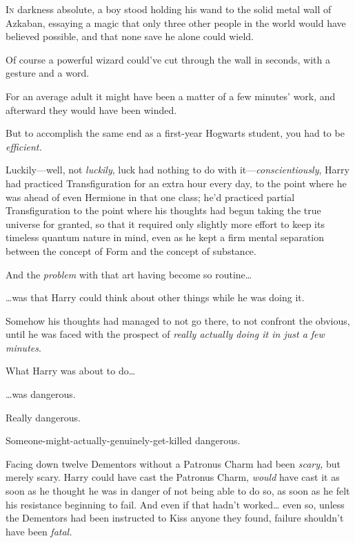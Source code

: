 
\lettrine{I}{n} darkness absolute, a boy stood holding his wand to the solid metal wall of 
Azkaban, essaying a magic that only three other people in the world would have 
believed possible, and that none save he alone could wield.

Of course a powerful wizard could've cut through the wall in seconds, with a 
gesture and a word.

For an average adult it might have been a matter of a few minutes' work, and 
afterward they would have been winded.

But to accomplish the same end as a first-year Hogwarts student, you had to be 
\emph{efficient.}

Luckily---well, not \emph{luckily}, luck had nothing to do with 
it---\emph{conscientiously}, Harry had practiced Transfiguration for an extra 
hour every day, to the point where he was ahead of even Hermione in that one 
class; he'd practiced partial Transfiguration to the point where his thoughts 
had begun taking the true universe for granted, so that it required only 
slightly more effort to keep its timeless quantum nature in mind, even as he 
kept a firm mental separation between the concept of Form and the concept of 
substance.

And the \emph{problem} with that art having become so routine{\ldots}

{\ldots}was that Harry could think about other things while he was doing it.

Somehow his thoughts had managed to not go there, to not confront the obvious, 
until he was faced with the prospect of \emph{really actually doing it in just 
a few minutes}.

What Harry was about to do{\ldots}

{\ldots}was dangerous.

Really dangerous.

Someone-might-actually-genuinely-get-killed dangerous.

Facing down twelve Dementors without a Patronus Charm had been \emph{scary,} 
but merely scary. Harry could have cast the Patronus Charm, \emph{would} have 
cast it as soon as he thought he was in danger of not being able to do so, as 
soon as he felt his resistance beginning to fail. And even if that hadn't 
worked{\ldots} even so, unless the Dementors had been instructed to Kiss anyone 
they found, failure shouldn't have been \emph{fatal.}

